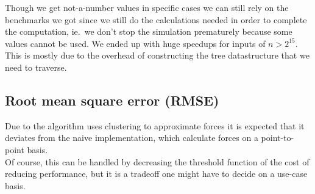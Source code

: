 Though we get not-a-number values in specific cases we can still rely on the
benchmarks we got since we still do the calculations needed in order to complete
the computation, ie.\ we don't stop the simulation prematurely because some
values cannot be used. We ended up with huge speedups for inputs of $n>2^{15}$.
This is mostly due to the overhead of constructing the tree datastructure that
we need to traverse.

\subsection{Root mean square error (RMSE)}
Due to the algorithm uses clustering to approximate forces it is expected that
it deviates from the naive implementation, which calculate forces on a
point-to-point basis.\\
Of course, this can be handled by decreasing the threshold function of the cost
of reducing performance, but it is a tradeoff one might have to decide on a
use-case basis.

\begin{Figure}
  \centering
  \label{fig:eatshit}
\end{Figure}

